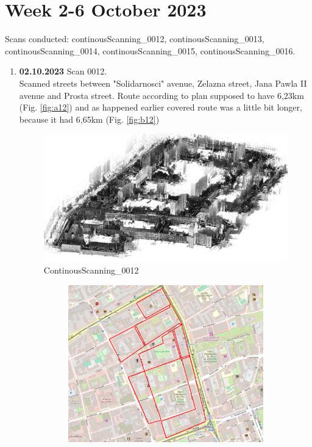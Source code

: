\documentclass[a4paper,12pt]{book}
\begin{document}
\section{Week 2-6 October 2023}
Scans conducted: continousScanning\_0012, continousScanning\_0013, continousScanning\_0014, continousScanning\_0015, continousScanning\_0016.\\
\begin{enumerate}
	\item \textbf{02.10.2023} Scan 0012. \\
	Scanned streets between "Solidarnosci" avenue, Zelazna street, Jana Pawla II avenue and Prosta street. Route according to plan supposed to have 6,23km (Fig. \ref{fig:a12}) and as happened earlier covered route was a little bit longer, because it had 6,65km (Fig. \ref{fig:b12})
	\begin{figure}[H]
		\includegraphics[width=1\linewidth]{cloud12}
		\caption{ContinousScanning\_0012}
	\end{figure}
	\begin{figure}[H]
		\centering
		\begin{subfigure}{.77\textwidth}
			\centering
			\includegraphics[width=1\linewidth]{route_p12}

\end{subfigure}
\end{figure}
\end{enumerate}
\end{document}
